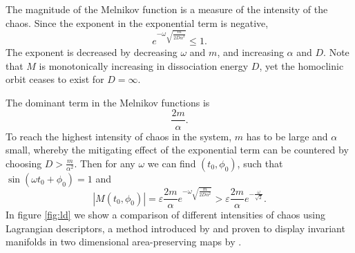 \documentclass{ws-ijbc}
\begin{document}
The magnitude of the Melnikov function is a measure of the intensity of the chaos. 
Since the exponent in the exponential term is negative, $$e^{-\omega\sqrt{\frac{m}{2D\alpha^2}}}\leq 1.$$ The exponent is decreased by decreasing $\omega$ and $m$, and increasing $\alpha$ and $D$. Note that $M$ is monotonically increasing in dissociation energy $D$, yet the homoclinic orbit ceases to exist for $D=\infty$.

The dominant term in the Melnikov functions is $$\frac{2m}{\alpha}.$$ To reach the highest intensity of chaos in the system, $m$ has to be large and $\alpha$ small, whereby the mitigating effect of the exponential term can be countered by choosing $D>\frac{m}{\alpha^2}$. Then for any $\omega$ we can find $(t_0,\phi_0)$, such that $\sin(\omega t_0+\phi_0)=1$ and
\begin{equation}
    |M(t_0,\phi_0)|=\varepsilon \frac{2m}{\alpha} e^{-\omega\sqrt{\frac{m}{2D\alpha^2}}} > \varepsilon \frac{2m}{\alpha}e^{-\frac{\omega}{\sqrt{2}}}.
\label{eq:Melnikovmag}
\end{equation}
In figure \ref{fig:ld} we show a comparison of different intensities of chaos using Lagrangian descriptors, a method introduced by \cite{madrid2009ld} and proven to display invariant manifolds in two dimensional area-preserving maps by \cite{lopesino2015cnsns}.
\end{document}

